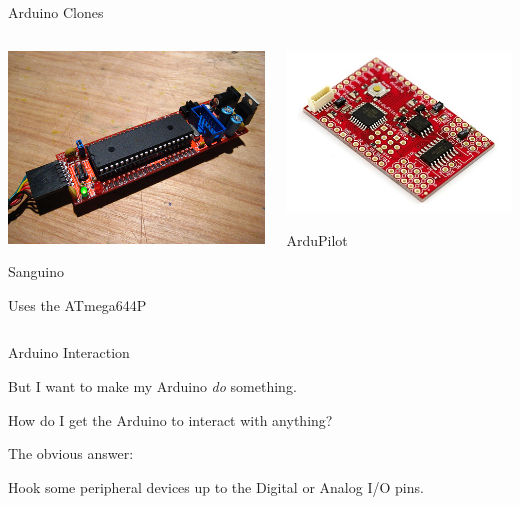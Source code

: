 \documentclass{beamer}
\begin{document}
\begin{frame}{Arduino Clones}
  \begin{columns}
    \pause
    \begin{column}{0.5\textwidth}
      \centerline{\includegraphics[width=.95\textwidth]{Sanguino.jpg}}
      \centerline{Sanguino}
      \centerline{Uses the ATmega644P}
    \end{column}
    \pause
    \begin{column}{0.5\textwidth}
      \centerline{\includegraphics[width=.95\textwidth]{ardupilot.jpg}}
      \centerline{ArduPilot}
    \end{column}
  \end{columns}
\end{frame}

\begin{frame}{Arduino Interaction}
  \centerline{But I want to make my Arduino \emph{do} something.}
  \centerline{How do I get the Arduino to interact with anything?}
  \pause
  \bigskip
  \centerline{The obvious answer:}
  \centerline{Hook some peripheral devices up to the Digital or Analog I/O pins.}
\end{frame}
\end{document}
